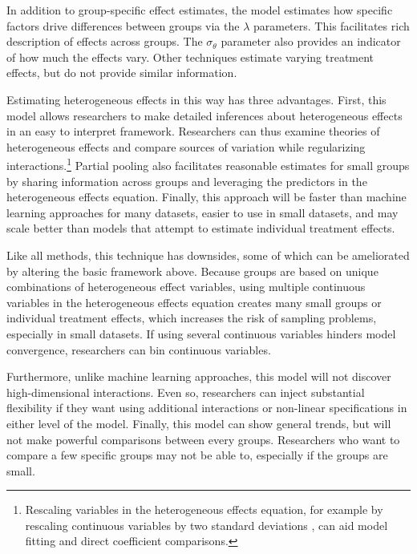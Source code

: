 \documentclass[12pt]{article}
\begin{document}
In addition to group-specific effect estimates, the model estimates how specific factors drive differences between groups via the $\lambda$ parameters.
This facilitates rich description of effects across groups. 
The $\sigma_\theta$ parameter also provides an indicator of how much the effects vary. 
Other techniques estimate varying treatment effects, but do not provide similar information.


Estimating heterogeneous effects in this way has three advantages.
First, this model allows researchers to make detailed inferences about heterogeneous effects in an easy to interpret framework. 
Researchers can thus examine theories of heterogeneous effects and compare sources of variation while regularizing interactions.\footnote{Rescaling variables in the heterogeneous effects equation, for example by rescaling continuous variables by two standard deviations \citep{Gelman2008}, can aid model fitting and direct coefficient comparisons.} 
Partial pooling also facilitates reasonable estimates for small groups by sharing information across groups and leveraging the predictors in the heterogeneous effects equation. 
Finally, this approach will be faster than machine learning approaches for many datasets, easier to use in small datasets, and may scale better than models that attempt to estimate individual treatment effects.


Like all methods, this technique has downsides, some of which can be ameliorated by altering the basic framework above. 
Because groups are based on unique combinations of heterogeneous effect variables, using multiple continuous variables in the heterogeneous effects equation creates many small groups or individual treatment effects, which increases the risk of sampling problems, especially in small datasets. 
If using several continuous variables hinders model convergence, researchers can bin continuous variables.


Furthermore, unlike machine learning approaches, this model will not discover high-dimensional interactions. 
Even so, researchers can inject substantial flexibility if they want using additional interactions or non-linear specifications in either level of the model. 
Finally, this model can show general trends, but will not make powerful comparisons between every groups. 
Researchers who want to compare a few specific groups may not be able to, especially if the groups are small.
\end{document}
